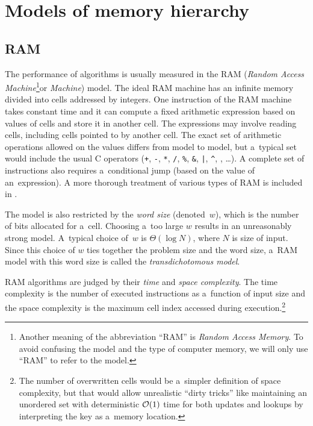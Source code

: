 \chapter{Models of memory hierarchy}
\label{chapter:models}
\section{RAM}

The performance of algorithms is usually measured in the RAM
(\emph{Random Access Machine}\footnote{%
	Another meaning of the abbreviation ``RAM'' is \emph{Random Access
	Memory}. To avoid confusing the model and the type of computer memory,
	we will only use ``RAM'' to refer to the model.
}or \emph{Machine}) model.
The ideal RAM machine has an infinite memory divided into cells addressed
by integers.
One instruction of the RAM machine takes constant time and it
can compute a fixed arithmetic expression based on values of cells and store it
in another cell. The expressions may involve reading cells, including cells
pointed to by another cell. The exact set of arithmetic operations allowed
on the values differs from model to model, but a~typical set would include
the usual C operators (\texttt{+}, \texttt{-}, \texttt{*}, \texttt{/},
\texttt{\%}, \texttt{\&}, \texttt{|}, \texttt{\^},
\texttt{\raisebox{0.5ex}{\texttildelow}},
\dots).  A complete set of instructions also requires a~conditional jump (based
on the value of an~expression).
A more thorough treatment of various types of RAM is included
in \cite{saga-of-msts}.

The model is also restricted by the \textit{word size} (denoted~$w$),
which is the number of bits allocated for a~cell. Choosing a~too large $w$
results in an unreasonably strong model. A~typical choice of~$w$ is
$\Theta(\log N)$, where $N$ is size of input.
Since this choice of $w$ ties together the problem size and the word size,
a~RAM model with this word size is called the \textit{transdichotomous model}.

RAM algorithms are judged by their \emph{time} and \emph{space complexity}.
The time complexity is the number of executed instructions as a~function of
input size and the space complexity is the maximum cell index accessed during
execution.\footnote{%
	The number of overwritten cells would be a~simpler definition
	of space complexity, but that would allow unrealistic ``dirty tricks''
	like maintaining an unordered set with deterministic $\mathcal{O}(1)$ time
	for both updates and lookups by interpreting the key as a~memory
	location.
}

